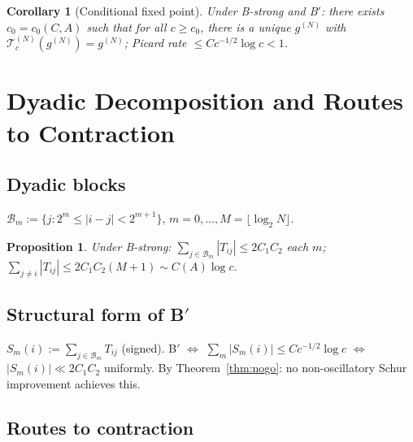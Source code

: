 \documentclass[12pt,a4paper]{article}
\newtheorem{proposition}[theorem]{Proposition}
\newtheorem{corollary}[theorem]{Corollary}
\begin{document}
\begin{corollary}[Conditional fixed point]\label{cor:fixedpoint}
Under B-strong and B$'$: there exists $c_0=c_0(C,A)$ such that
for all $c\geq c_0$, there is a unique $g^{(N)}$ with
$\mathcal{T}_c^{(N)}(g^{(N)})=g^{(N)}$;
Picard rate $\leq Cc^{-1/2}\log c<1$.
\end{corollary}

\section{Dyadic Decomposition and Routes to Contraction}
\label{sec:dyadic}

\subsection{Dyadic blocks}

$\mathcal{B}_m:=\{j:2^m\leq|i-j|<2^{m+1}\}$,
$m=0,\ldots,M=\lfloor\log_2 N\rfloor$.

\begin{proposition}\label{prop:dyadic_block}
Under B-strong:
$\sum_{j\in\mathcal{B}_m}|T_{ij}|\leq2C_1C_2$ each $m$;
$\sum_{j\neq i}|T_{ij}|\leq2C_1C_2(M+1)\sim C(A)\log c$.
\end{proposition}

\subsection{Structural form of B$'$}

$S_m(i):=\sum_{j\in\mathcal{B}_m}T_{ij}$ (signed).
B$'$ $\Leftrightarrow$ $\sum_m|S_m(i)|\leq Cc^{-1/2}\log c$
$\Leftrightarrow$ $|S_m(i)|\ll 2C_1C_2$ uniformly.
By Theorem~\ref{thm:nogo}: no non-oscillatory Schur improvement
achieves this.

\subsection{Routes to contraction}
\end{document}
